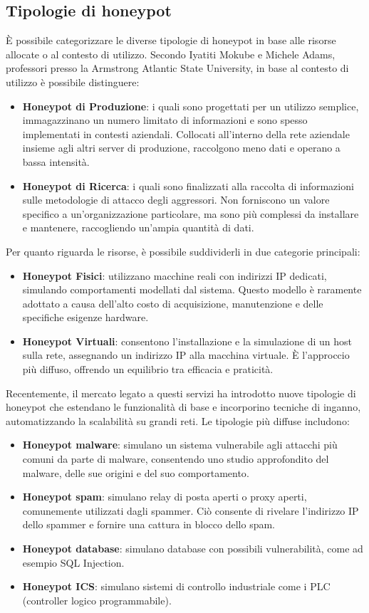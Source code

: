 \subsection{Tipologie di honeypot}
È possibile categorizzare le diverse tipologie di honeypot in base alle risorse allocate o al contesto di utilizzo. Secondo Iyatiti Mokube e Michele Adams, professori presso la Armstrong Atlantic State University, in base al contesto di utilizzo è possibile distinguere\cite{tax}:
\begin{itemize}
	\item \textbf{Honeypot di Produzione}: i quali sono progettati per un utilizzo semplice, immagazzinano un numero limitato di informazioni e sono spesso implementati in contesti aziendali. Collocati all'interno della rete aziendale insieme agli altri server di produzione, raccolgono meno dati e operano a bassa intensità\cite{produzione}.
	\item \textbf{Honeypot di Ricerca}: i quali sono finalizzati alla raccolta di informazioni sulle metodologie di attacco degli aggressori. Non forniscono un valore specifico a un'organizzazione particolare, ma sono più complessi da installare e mantenere, raccogliendo un'ampia quantità di dati\cite{ricerca}.
\end{itemize}
Per quanto riguarda le risorse, è possibile suddividerli in due categorie principali:
\begin{itemize}
	\item \textbf{Honeypot Fisici}: utilizzano macchine reali con indirizzi IP 	dedicati, simulando comportamenti modellati dal sistema. Questo modello è raramente adottato a causa dell'alto costo di acquisizione, manutenzione e delle specifiche esigenze hardware.
	\item \textbf{Honeypot Virtuali}: consentono l'installazione e la simulazione di un host sulla rete, assegnando un indirizzo IP alla macchina virtuale. È l'approccio più diffuso, offrendo un equilibrio tra efficacia e praticità\cite{tipologie1}.
\end{itemize}
Recentemente, il mercato legato a questi servizi ha introdotto nuove tipologie di honeypot che estendano le funzionalità di base e incorporino tecniche di inganno, automatizzando la scalabilità su grandi reti. Le tipologie più diffuse includono:
\begin{itemize}
	\item \textbf{Honeypot malware}: simulano un sistema vulnerabile agli attacchi più comuni da parte di malware, consentendo uno studio approfondito del malware, delle sue origini e del suo comportamento\cite{malware}.
	\item \textbf{Honeypot spam}: simulano relay di posta aperti o proxy aperti, comunemente utilizzati dagli spammer. Ciò consente di rivelare l'indirizzo IP dello spammer e fornire una cattura in blocco dello spam\cite{spam}.
	\item \textbf{Honeypot database}: simulano database con possibili vulnerabilità, come ad esempio SQL Injection\cite{database}.
	\item \textbf{Honeypot ICS}: simulano sistemi di controllo industriale come i PLC (controller logico programmabile)\cite{ics}.
\end{itemize}

